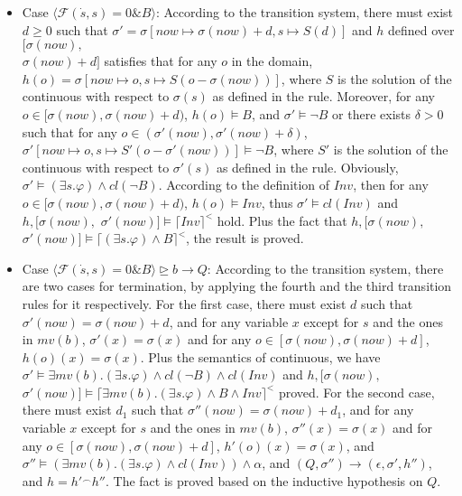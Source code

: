\documentclass{llncs}
\newcommand{\evolution}[3]{\langle \mathcal{#1}(\dot{#2},#2)=0 \& #3\rangle}
\newcommand{\bexempt}[3]{#1 \unrhd #2 \rightarrow #3}
\newcommand{\pstop}{\epsilon}
\newcommand{\now}{now}
\newcommand{\la}{\ensuremath{\langle}}
\newcommand{\ra}{\ensuremath{\rangle}}
\newcommand{\chop}{\smallfrown}
\newcommand{\dceil}[1]{\lceil #1 \rceil}
\newcommand{\close}[1]{cl(#1)}
\newcommand{\Pre}{\varphi}
\begin{document}
\begin{itemize}
    \item Case $\la\mathcal{F}(\dot{s},s)=0 \& B \ra$: According to the transition system,
    there must exist $d \geq 0$ such that $\sigma'=\sigma[\now \mapsto \sigma(\now)+d, s\mapsto S(d)]$  and
    $h$ defined over $[\sigma(now), $\\
    $\sigma(now)+d]$ satisfies that
    for any $o$ in the domain,  $h(o)  = \sigma[now \mapsto o, s \mapsto S(o-\sigma(now))]$, where
    $S$ is the solution of the continuous with respect to $\sigma(s)$ as defined in the rule.
   Moreover, for any $o \in [\sigma(now), \sigma(now)+d)$,
    $h(o) \models B$, and $\sigma' \models \neg B$ or there exists $\delta>0$ such that
    for any $o \in (\sigma'(now), \sigma'(now)+\delta)$,
    $\sigma'[now \mapsto o, s\mapsto S'(o-\sigma'(now))] \models \neg B$,
    where
    $S'$ is the solution of the continuous with respect to $\sigma'(s)$ as defined in the rule.
    Obviously, $\sigma' \models (\exists s. \Pre) \wedge \close{\neg B}$. According to the definition
    of $Inv$, then for any $o \in [\sigma(now), \sigma(now)+d)$,
    $h(o) \models Inv$, thus
    $\sigma' \models \close{Inv}$ and $h, [\sigma(now),$
    $\sigma'(now)]  \models \dceil{Inv}^<$ hold.
    Plus the fact that $h, [\sigma(now),$
    $\sigma'(now)] \models \dceil{(\exists s. \Pre) \wedge B}^<$, the result is proved.

    \item Case $\bexempt{\evolution{F}{s}{B}}{b}{Q}$: According to the transition system, there are two
    cases for termination, by applying the fourth and the third transition rules for it respectively.
    For the first case, there must exist $d$ such that $\sigma'(now) = \sigma(now) + d$,
    and for any variable $x$ except for $s$ and the ones in $mv(b)$, $\sigma'(x) = \sigma(x)$
    and for any $o\in [\sigma(now), \sigma(now)+d]$, $h(o)(x) = \sigma(x)$. Plus the semantics of
    continuous, we have
    $\sigma' \models \exists mv(b). (\exists s. \Pre) \wedge \close{\neg B} \wedge \close{Inv}$
    and $h, [\sigma(now), $
    $\sigma'(now)]  \models \dceil{\exists mv(b). (\exists s. \Pre )\wedge B \wedge Inv}^<$ proved.
    For the second case, there must exist $d_1$ such that $\sigma''(now) = \sigma(now) + d_1$,
    and for any variable $x$ except for $s$ and the ones in $mv(b)$, $\sigma''(x) = \sigma(x)$
    and for any $o\in [\sigma(now), \sigma(now)+d]$, $h'(o)(x) = \sigma(x)$, and
    $\sigma'' \models (\exists mv(b). (\exists s. \Pre) \wedge \close{Inv}) \wedge\alpha$, and $(Q, \sigma'') \rightarrow (\pstop, \sigma', h'')$, and
    $h = h' {}^\chop h''$. The fact is proved based on the inductive hypothesis on $Q$.


\end{itemize}
\end{document}
